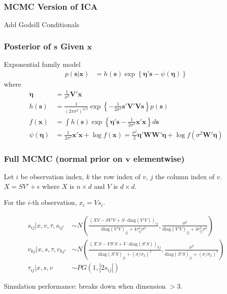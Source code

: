 \documentclass{beamer}
\begin{document}
\begin{frame}
\frametitle{MCMC Version of ICA} 

Add Godsill Conditionals 


\end{frame}
\begin{frame}

\frametitle{Posterior of $\bm s$ Given $\bm x$}
\footnotesize

Exponential family model 
\begin{align*}
p(\bm s| \bm x) 
&= h(\bm s) \exp\left\{\bm{\eta's} - \psi(\bm\eta) \right\}
\end{align*}
where
\begin{align*}
\bm\eta &= \frac{1}{\sigma^2}\bm{V'x} \\
h(\bm s) &= \frac{1}{(2\pi \sigma^2)^{q/2}} \exp\left\{-\frac{1}{2\sigma^2} \bm{s'V'Vs}\right\} p(\bm s)\\
f(\bm x) &= \int  h(\bm s) \exp\left\{\bm{\eta's} - \frac{1}{2\sigma^2}\bm{x'x} \right\} d\bm s\\
\psi(\bm \eta) &= \frac{1}{2\sigma^2}\bm{x'x} +\log f(\bm x) = \frac{\sigma^2}{2}\bm{\eta'WW'\eta} + \log f(\sigma^2 \bm{W'\eta})
\end{align*}


\end{frame}

\begin{frame}
\frametitle{Full MCMC (normal prior on $\bm{v}$ elementwise)}
\footnotesize
Let $i$ be observation index, $k$ the row index of $v$, $j$ the column index of $v$. $X = SV' + \epsilon$ where $X$ is $n\times d$ and $V$ is $d\times d$. 

\vspace{0.1in} 

For the $i$-th observation, $x_i = V s_i$.

{\footnotesize

\begin{align*}
s_{ij} | x, v,\tau, s_{ij'} &\sim N\left(\frac{\left(XV-SV'V+S\cdot\text{diag}(V'V)\right)_{ij}}{\text{diag}(V'V)_{jj} + 4\tau_{ij}^2\sigma^2}, \frac{\sigma^2}{\text{diag}(V'V)_{jj} + 4\tau_{ij}^2 \sigma^2}\right) \\
v_{kj} | x, s, \tau, v_{kj'} &\sim N\left(\frac{\left(X'S-VS'S+V\cdot\text{diag}(S'S)\right)_{kj}}{\text{diag}(S'S)_{jj} + (\sigma/\sigma_2)^2}, \frac{\sigma^2}{\text{diag}(S'S)_{jj} + (\sigma/\sigma_2)^2} \right)\\
\tau_{ij} | x, s, v &\sim PG(1, |2s_{ij}|)
\end{align*}
}

Simulation performance: breaks down when dimension $> 3$.

\end{frame}
\end{document}
